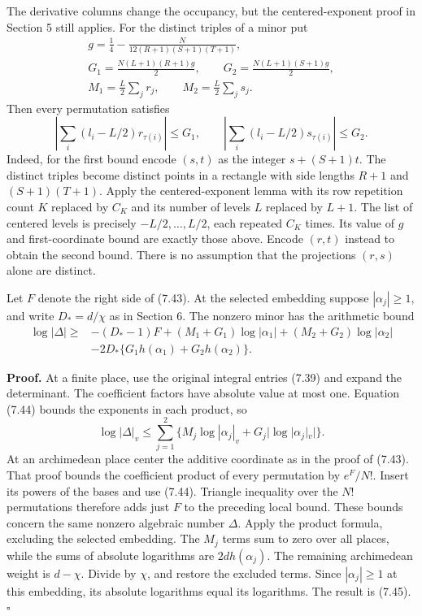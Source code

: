 \documentclass[
  11pt,
  a4paper,
]{article}
\begin{document}
The derivative columns change the occupancy, but the centered-exponent
proof in Section 5 still applies. For the distinct triples of a minor
put \[
\begin{gathered}
g=\frac14-\frac{N}{12(R+1)(S+1)(T+1)},\\
G_1=\frac{N(L+1)(R+1)g}{2},\qquad
G_2=\frac{N(L+1)(S+1)g}{2},\\
M_1=\frac L2\sum_j r_j,\qquad M_2=\frac L2\sum_j s_j.
\end{gathered}
\] Then every permutation satisfies \[
\left|\sum_i(l_i-L/2)r_{\tau(i)}\right|\le G_1,
\qquad
\left|\sum_i(l_i-L/2)s_{\tau(i)}\right|\le G_2. \tag{7.44}
\] Indeed, for the first bound encode \((s,t)\) as the integer
\(s+(S+1)t\). The distinct triples become distinct points in a rectangle
with side lengths \(R+1\) and \((S+1)(T+1)\). Apply the
centered-exponent lemma with its row repetition count \(K\) replaced by
\(C_K\) and its number of levels \(L\) replaced by \(L+1\). The list of
centered levels is precisely \(-L/2,\ldots,L/2\), each repeated \(C_K\)
times. Its value of \(g\) and first-coordinate bound are exactly those
above. Encode \((r,t)\) instead to obtain the second bound. There is no
assumption that the projections \((r,s)\) alone are distinct.

Let \(F\) denote the right side of (7.43). At the selected embedding
suppose \(|\alpha_j|\ge1\), and write \(D_*=d/\chi\) as in Section 6.
The nonzero minor has the arithmetic bound \[
\begin{aligned}
\log|\Delta|\ge{}&-(D_*-1)F
+(M_1+G_1)\log|\alpha_1|+(M_2+G_2)\log|\alpha_2|\\
&-2D_*\{G_1h(\alpha_1)+G_2h(\alpha_2)\}.
\end{aligned} \tag{7.45}
\]

\textbf{Proof.} At a finite place, use the original integral entries
(7.39) and expand the determinant. The coefficient factors have absolute
value at most one. Equation (7.44) bounds the exponents in each product,
so \[
\log|\Delta|_v\le\sum_{j=1}^2
\{M_j\log|\alpha_j|_v+G_j|\log|\alpha_j|_v|\}.
\] At an archimedean place center the additive coordinate as in the
proof of (7.43). That proof bounds the coefficient product of every
permutation by \(e^F/N!\). Insert its powers of the bases and use
(7.44). Triangle inequality over the \(N!\) permutations therefore adds
just \(F\) to the preceding local bound. These bounds concern the same
nonzero algebraic number \(\Delta\). Apply the product formula,
excluding the selected embedding. The \(M_j\) terms sum to zero over all
places, while the sums of absolute logarithms are \(2d h(\alpha_j)\).
The remaining archimedean weight is \(d-\chi\). Divide by \(\chi\), and
restore the excluded terms. Since \(|\alpha_j|\ge1\) at this embedding,
its absolute logarithms equal its logarithms. The result is (7.45).
\(\square\)
\end{document}
